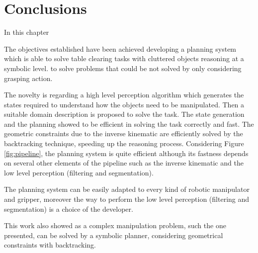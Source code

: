 \chapter{Conclusions}
\label{ch:conclusions}

In this chapter 

The objectives established have been achieved developing a planning system which is able to solve table clearing tasks with cluttered objects reasoning at a symbolic level.  to solve problems that could be not solved by only considering  grasping action.

The novelty is regarding a high level perception algorithm which generates the states required to understand how the objects need to be manipulated. Then a suitable domain description is proposed to solve the task. The state generation and the planning showed to be efficient in solving the task correctly and fast. 
The geometric constraints due to the inverse kinematic are efficiently solved by the backtracking technique, speeding up the reasoning process. Considering Figure \ref{fig:pipeline}, the planning system is quite efficient although its fastness depends on several other elements of the pipeline such as the inverse kinematic and the low level perception (filtering and segmentation).  

The planning system can be easily adapted to every kind of robotic manipulator and gripper, moreover the way to perform the low level perception (filtering and segmentation) is a choice of the developer. 

This work also showed as a complex manipulation problem, such the one presented, can be solved by a symbolic planner, considering geometrical constraints with backtracking. 

